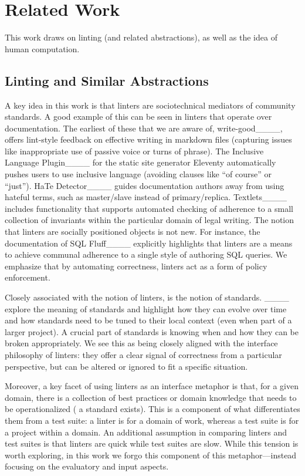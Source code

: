 \section{Related Work}
This work draws on linting (and related abstractions), as well as the idea of human computation.


\subsection{Linting and Similar Abstractions}

A key idea in this work is that linters are sociotechnical mediators of  community standards.
A good example of this can be seen in linters that operate over documentation.
The earliest of these that we are aware of, write-good____, offers lint-style feedback on effective writing in markdown files (capturing issues like inappropriate use of passive voice or turns of phrase).
The Inclusive Language Plugin____ for the static site generator Eleventy automatically pushes users to use inclusive language (avoiding clauses like ``of course'' or ``just'').
HaTe Detector____ guides documentation authors away from using hateful terms, such as master/slave instead of primary/replica.
Textlets____ includes functionality that supports automated checking of adherence to a small collection of invariants within the particular domain of legal writing.
The notion that linters are socially positioned objects is not new. For instance, the documentation of SQL Fluff____ explicitly highlights that linters are a means to achieve communal adherence to a single style of authoring SQL queries.
We emphasize that by automating correctness, linters act as a form of policy enforcement.









Closely associated with the notion of linters, is the notion of standards. ____ explore the meaning of standards and highlight how they can evolve over time and how standards need to be tuned to their local context (even when part of a larger project). A crucial part of standards is knowing when and how they can be broken appropriately.
We see this as being closely aligned with the interface philosophy of linters: they offer a clear signal of correctness from a particular perspective, but can be altered or ignored to fit a specific situation.

Moreover, a key facet of using linters as an interface metaphor is that, for a given domain, there is a collection of best practices or domain knowledge that needs to be operationalized (\ie{} a standard exists). This is a component of what differentiates them from a test suite: a linter is for a domain of work, whereas a test suite is for a project within a domain.
An additional assumption in comparing linters and test suites is that linters are quick while test suites are slow.
While this tension is worth exploring, in this work we forgo this component of this metaphor---instead focusing on the evaluatory and input aspects.



